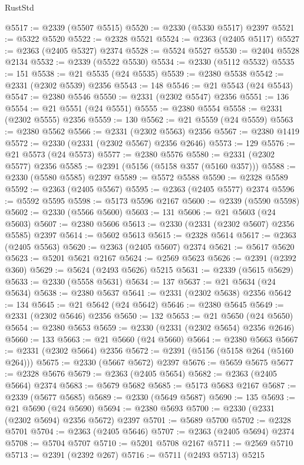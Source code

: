 \begin{lexlean}{RustStd}
\begin{coremodule}
@5517 := @2339 (@5507 @5515)
@5520 := @2330 (@5330 @5517) @2397
@5521 := @5322 @5520
@5522 := @2328 @5521
@5524 := @2363 (@2405 @5117)
@5527 := @2363 (@2405 @5327) @2374
@5528 := @5524 @5527
@5530 := @2404 @5528 @2134
@5532 := @2339 (@5522 @5530)
@5534 := @2330 (@5112 @5532)
@5535 := 151
@5538 := @21 @5535 (@24 @5535)
@5539 := @2380 @5538
@5542 := @2331 (@2302 @5539) @2356
@5543 := 148
@5546 := @21 @5543 (@24 @5543)
@5547 := @2380 @5546
@5550 := @2331 (@2302 @5547) @2356
@5551 := 136
@5554 := @21 @5551 (@24 @5551)
@5555 := @2380 @5554
@5558 := @2331 (@2302 @5555) @2356
@5559 := 130
@5562 := @21 @5559 (@24 @5559)
@5563 := @2380 @5562
@5566 := @2331 (@2302 @5563) @2356
@5567 := @2380 @1419
@5572 := @2330 (@2331 (@2302 @5567) @2356 @2646)
@5573 := 129
@5576 := @21 @5573 (@24 @5573)
@5577 := @2380 @5576
@5580 := @2331 (@2302 @5577) @2356
@5585 := @2391 (@5156 (@5158 @357 (@5160 @357)))
@5588 := @2330 (@5580 @5585) @2397
@5589 := @5572 @5588
@5590 := @2328 @5589
@5592 := @2363 (@2405 @5567)
@5595 := @2363 (@2405 @5577) @2374
@5596 := @5592 @5595
@5598 := @5173 @5596 @2167
@5600 := @2339 (@5590 @5598)
@5602 := @2330 (@5566 @5600)
@5603 := 131
@5606 := @21 @5603 (@24 @5603)
@5607 := @2380 @5606
@5613 := @2330 (@2331 (@2302 @5607) @2356 @5585) @2397
@5614 := @5602 @5613
@5615 := @2328 @5614
@5617 := @2363 (@2405 @5563)
@5620 := @2363 (@2405 @5607) @2374
@5621 := @5617 @5620
@5623 := @5201 @5621 @2167
@5624 := @2569 @5623
@5626 := @2391 (@2392 @360)
@5629 := @5624 (@2493 @5626) @5215
@5631 := @2339 (@5615 @5629)
@5633 := @2330 (@5558 @5631)
@5634 := 137
@5637 := @21 @5634 (@24 @5634)
@5638 := @2380 @5637
@5641 := @2331 (@2302 @5638) @2356
@5642 := 134
@5645 := @21 @5642 (@24 @5642)
@5646 := @2380 @5645
@5649 := @2331 (@2302 @5646) @2356
@5650 := 132
@5653 := @21 @5650 (@24 @5650)
@5654 := @2380 @5653
@5659 := @2330 (@2331 (@2302 @5654) @2356 @2646)
@5660 := 133
@5663 := @21 @5660 (@24 @5660)
@5664 := @2380 @5663
@5667 := @2331 (@2302 @5664) @2356
@5672 := @2391 (@5156 (@5158 @264 (@5160 @264)))
@5675 := @2330 (@5667 @5672) @2397
@5676 := @5659 @5675
@5677 := @2328 @5676
@5679 := @2363 (@2405 @5654)
@5682 := @2363 (@2405 @5664) @2374
@5683 := @5679 @5682
@5685 := @5173 @5683 @2167
@5687 := @2339 (@5677 @5685)
@5689 := @2330 (@5649 @5687)
@5690 := 135
@5693 := @21 @5690 (@24 @5690)
@5694 := @2380 @5693
@5700 := @2330 (@2331 (@2302 @5694) @2356 @5672) @2397
@5701 := @5689 @5700
@5702 := @2328 @5701
@5704 := @2363 (@2405 @5646)
@5707 := @2363 (@2405 @5694) @2374
@5708 := @5704 @5707
@5710 := @5201 @5708 @2167
@5711 := @2569 @5710
@5713 := @2391 (@2392 @267)
@5716 := @5711 (@2493 @5713) @5215

\end{coremodule}
\end{lexlean}

